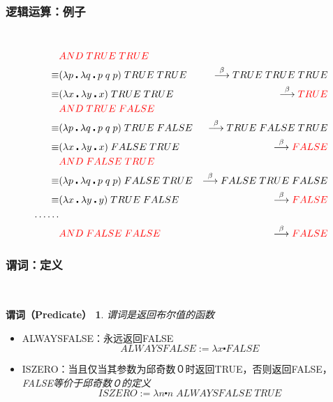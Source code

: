 \documentclass[CJK,compress,hyperref]{beamer}
\begin{document}
\begin{CJK}{UTF8}{song}
\begin{frame}
  \frametitle{逻辑运算：例子}　
  \begin{eqnarray*}
    & {\color{red}AND \; TRUE \; TRUE} & \\ 
    \equiv & (\lambda p \centerdot \lambda q \centerdot p \; q \; p) \; TRUE \; TRUE & \stackrel{\beta}{\longrightarrow} TRUE \; TRUE \; TRUE \\ 
    \equiv & (\lambda x \centerdot \lambda y \centerdot x) \; TRUE \; TRUE & \stackrel{\beta}{\longrightarrow} {\color{red}TRUE} \\ 
    & {\color{red}AND \; TRUE \; FALSE} & \\ 
    \equiv & (\lambda p \centerdot \lambda q \centerdot p \; q \; p) \; TRUE \; FALSE & \stackrel{\beta}{\longrightarrow} TRUE \; FALSE \; TRUE \\ 
    \equiv & (\lambda x \centerdot \lambda y \centerdot x) \; FALSE \; TRUE & \stackrel{\beta}{\longrightarrow} {\color{red}FALSE} \\ 
    & {\color{red}AND \; FALSE \; TRUE} & \\ 
    \equiv & (\lambda p \centerdot \lambda q \centerdot p \; q \; p) \; FALSE \; TRUE & \stackrel{\beta}{\longrightarrow} FALSE \; TRUE \; FALSE \\ 
    \equiv & (\lambda x \centerdot \lambda y \centerdot y) \; TRUE \; FALSE & \stackrel{\beta}{\longrightarrow} {\color{red}FALSE} \\ 
    \dots \dots  \\ 
    & {\color{red}AND \; FALSE \; FALSE} & \stackrel{\beta}{\longrightarrow} {\color{red}FALSE} \\ 
  \end{eqnarray*}
\end{frame}

\begin{frame}
  \frametitle{谓词：定义}　
  \newtheorem{predF}{谓词（Predicate）} 
  \begin{predF}
    谓词是返回布尔值的函数 
  \end{predF}
  \begin{itemize}
  \item ALWAYSFALSE：永远返回FALSE 
    \begin{displaymath}
      ALWAYSFALSE := \lambda x \centerdot FALSE 
    \end{displaymath}
  \item ISZERO：当且仅当其参数为邱奇数０时返回TRUE，否则返回FALSE，\emph{\color{red}FALSE等价于邱奇数０的定义}
    \begin{displaymath}
      ISZERO := \lambda n \centerdot n \; ALWAYSFALSE \; TRUE
    \end{displaymath}
  \end{itemize}
\end{frame}


\end{CJK}
\end{document}
